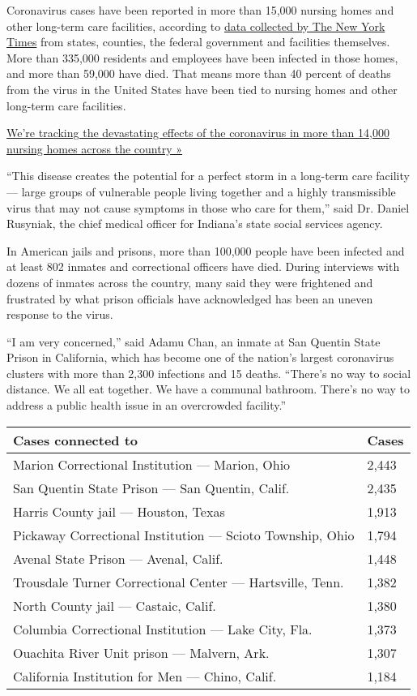 Coronavirus cases have been reported in more than 15,000 nursing homes
and other long-term care facilities, according to
\href{https://www.nytimes.com/interactive/2020/us/coronavirus-nursing-homes.html}{data
collected by The New York Times} from states, counties, the federal
government and facilities themselves. More than 335,000 residents and
employees have been infected in those homes, and more than 59,000 have
died. That means more than 40 percent of deaths from the virus in the
United States have been tied to nursing homes and other long-term care
facilities.

\href{https://www.nytimes.com/interactive/2020/us/coronavirus-nursing-homes.html}{We're
tracking the devastating effects of the coronavirus in more than 14,000
nursing homes across the country »}

``This disease creates the potential for a perfect storm in a long-term
care facility --- large groups of vulnerable people living together and
a highly transmissible virus that may not cause symptoms in those who
care for them,'' said Dr. Daniel Rusyniak, the chief medical officer for
Indiana's state social services agency.

In American jails and prisons, more than 100,000 people have been
infected and at least 802 inmates and correctional officers have died.
During interviews with dozens of inmates across the country, many said
they were frightened and frustrated by what prison officials have
acknowledged has been an uneven response to the virus.

``I am very concerned,'' said Adamu Chan, an inmate at San Quentin State
Prison in California, which has become one of the nation's largest
coronavirus clusters with more than 2,300 infections and 15 deaths.
``There's no way to social distance. We all eat together. We have a
communal bathroom. There's no way to address a public health issue in an
overcrowded facility.''

\begin{longtable}[]{@{}ll@{}}
\toprule
Cases connected to & Cases\tabularnewline
\midrule
\endhead
Marion Correctional Institution --- Marion, Ohio & 2,443 \tabularnewline
San Quentin State Prison --- San Quentin, Calif. & 2,435 \tabularnewline
Harris County jail --- Houston, Texas & 1,913 \tabularnewline
Pickaway Correctional Institution --- Scioto Township, Ohio & 1,794
\tabularnewline
Avenal State Prison --- Avenal, Calif. & 1,448 \tabularnewline
Trousdale Turner Correctional Center --- Hartsville, Tenn. & 1,382
\tabularnewline
North County jail --- Castaic, Calif. & 1,380 \tabularnewline
Columbia Correctional Institution --- Lake City, Fla. & 1,373
\tabularnewline
Ouachita River Unit prison --- Malvern, Ark. & 1,307 \tabularnewline
California Institution for Men --- Chino, Calif. & 1,184 \tabularnewline
\bottomrule
\end{longtable}


